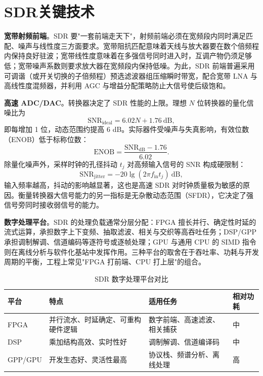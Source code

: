 \section{SDR关键技术}
\label{sec:sdr_key_technologies}

\textbf{宽带射频前端}。SDR 要"一套前端走天下"，射频前端必须在宽频段内同时满足匹配、噪声与线性度三方面要求。宽带阻抗匹配意味着天线与放大器要在数个倍频程内保持良好驻波；宽带线性度意味着在多强信号同时进入时，互调产物仍须足够低；宽带噪声系数则要求放大器在宽频段内保持低噪。为此，SDR 前端普遍采用可调谐（或开关切换的子倍频程）预选滤波器组压缩瞬时带宽，配合宽带 LNA 与高线性度混频器，并利用 AGC 与增益分配策略防止大信号使后级饱和。

\textbf{高速 ADC/DAC}。转换器决定了 SDR 性能的上限。理想 $N$ 位转换器的量化信噪比为
\[
\mathrm{SNR}_{\mathrm{ideal}} = 6.02N + 1.76 \ \mathrm{dB},
\]
即每增加 1 位，动态范围约提高 6 dB。实际器件受噪声与失真影响，有效位数（ENOB）低于标称位数：
\[
\mathrm{ENOB} = \frac{\mathrm{SNR}_{\mathrm{dB}} - 1.76}{6.02}.
\]
除量化噪声外，采样时钟的孔径抖动 $t_j$ 对高频输入信号的 SNR 构成硬限制：
\[
\mathrm{SNR}_{\mathrm{jitter}} = -20\lg\left(2\pi f_{\mathrm{in}} t_j\right) \ \mathrm{dB},
\]
输入频率越高，抖动的影响越显著，这也是高速 SDR 对时钟质量极为敏感的原因。衡量转换器大信号能力的另一指标是无杂散动态范围（SFDR），它决定了强信号旁同时接收弱信号的能力。

\textbf{数字处理平台}。SDR 的处理负载通常分层分配：FPGA 擅长并行、确定性时延的流式运算，承担数字上下变频、抽取滤波、相关与交织等高吞吐任务；DSP/GPP 承担调制解调、信道编码等逐符号或逐帧处理；GPU 与通用 CPU 的 SIMD 指令则在离线分析与软件化基站中发挥作用。三种平台的取舍在于吞吐率、功耗与开发周期的平衡，工程上常见"FPGA 打前端、CPU 打上层"的组合。

\begin{table}[htbp]
\centering
\caption{SDR 数字处理平台对比}
\label{tab:sdr_platforms}
\begin{tabular}{|p{2.4cm}|p{4.6cm}|p{4.2cm}|p{2.6cm}|}
\hline
\textbf{平台} & \textbf{特点} & \textbf{适用任务} & \textbf{相对功耗} \\
\hline
FPGA & 并行流水、时延确定、可重构硬件逻辑 & 数字前端、高速滤波、相关捕获 & 中 \\
\hline
DSP & 乘加结构高效、实时性好 & 调制解调、信道编译码 & 中 \\
\hline
GPP/GPU & 开发生态好、灵活性最高 & 协议栈、频谱分析、离线处理 & 高 \\
\hline
\end{tabular}
\end{table}

